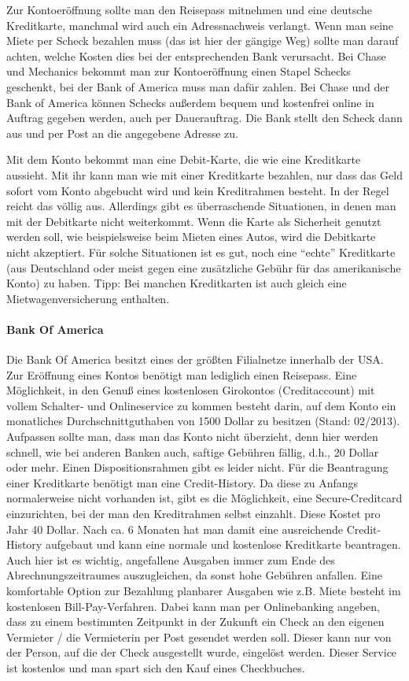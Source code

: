 \documentclass[a4paper]{scrreprt}
\begin{document}
Zur Kontoeröffnung sollte man den Reisepass mitnehmen und eine deutsche Kreditkarte, manchmal wird auch ein Adressnachweis verlangt. Wenn man seine Miete per Scheck bezahlen muss (das ist hier der gängige Weg) sollte man darauf achten, welche Kosten dies bei der entsprechenden Bank verursacht. Bei Chase und Mechanics bekommt man zur Kontoeröffnung einen Stapel Schecks geschenkt, bei der Bank of America muss man dafür zahlen. Bei Chase und der Bank of America können Schecks außerdem bequem und kostenfrei online in Auftrag gegeben werden, auch per Dauerauftrag. Die Bank stellt den Scheck dann aus und per Post an die angegebene Adresse zu.

Mit dem Konto bekommt man eine Debit-Karte, die wie eine Kreditkarte aussieht. Mit ihr kann man wie mit einer Kreditkarte bezahlen, nur dass das Geld sofort vom Konto abgebucht wird und kein Kreditrahmen besteht. In der Regel reicht das völlig aus. Allerdings gibt es überraschende Situationen, in denen man mit der Debitkarte nicht weiterkommt. Wenn die Karte als Sicherheit genutzt werden soll, wie beispielsweise beim Mieten eines Autos, wird die Debitkarte nicht akzeptiert. Für solche Situationen ist es gut, noch eine "`echte"' Kreditkarte (aus Deutschland oder meist gegen eine zusätzliche Gebühr für das amerikanische Konto) zu haben. Tipp: Bei manchen Kreditkarten ist auch gleich eine Mietwagenversicherung enthalten.

\paragraph{Bank Of America}  %
Die Bank Of America besitzt eines der gr\"o\ss{}ten Filialnetze innerhalb der USA. Zur Er\"offnung eines Kontos ben\"otigt man lediglich einen Reisepass. Eine M\"oglichkeit, in den Genu\ss{} eines kostenlosen Girokontos (Creditaccount) mit vollem Schalter- und Onlineservice zu kommen besteht darin, auf dem Konto ein monatliches Durchschnittguthaben von 1500 Dollar zu besitzen (Stand: 02/2013). Aufpassen sollte man, dass man das Konto nicht \"uberzieht, denn hier werden schnell, wie bei anderen Banken auch, saftige Geb\"uhren f\"allig, d.h., 20 Dollar oder mehr. Einen Dispositionsrahmen gibt es leider nicht. F\"ur die Beantragung einer Kreditkarte ben\"otigt man eine Credit-History. Da diese zu Anfangs normalerweise nicht vorhanden ist, gibt es die M\"oglichkeit, eine Secure-Creditcard einzurichten, bei der man den Kreditrahmen selbst einzahlt. Diese Kostet pro Jahr 40 Dollar. Nach ca. 6 Monaten hat man damit eine ausreichende Credit-History aufgebaut und kann eine normale und kostenlose Kreditkarte beantragen. Auch hier ist es wichtig, angefallene Ausgaben immer zum Ende des Abrechnungszeitraumes auszugleichen, da sonst hohe Geb\"uhren anfallen.
Eine komfortable Option zur Bezahlung planbarer Ausgaben wie z.B. Miete besteht im kostenlosen Bill-Pay-Verfahren. Dabei kann man per Onlinebanking angeben, dass zu einem bestimmten Zeitpunkt in der Zukunft ein Check an den eigenen Vermieter / die Vermieterin per Post gesendet werden soll. Dieser kann nur von der Person, auf die der Check ausgestellt wurde, eingel\"ost werden. Dieser Service ist kostenlos und man spart sich den Kauf eines Checkbuches.
\end{document}
